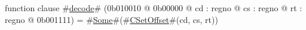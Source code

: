 function clause #\hyperref[zdecode]{decode}# (0b010010 @ 0b00000 @ cd : regno @ cs : regno @ rt : regno @ 0b001111) = #\hyperref[zSome]{Some}#(#\hyperref[zCSetOffset]{CSetOffset}#(cd, cs, rt))

